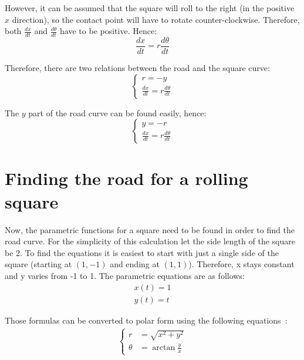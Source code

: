 \documentclass[12pt]{article}
\begin{document}
        However, it can be assumed that the square will roll to the right (in the positive $x$ direction), so the contact point will have to rotate counter-clockwise. Therefore, both $\frac{dx}{dt}$ and $\frac{d\theta}{dt}$ have to be positive. Hence:
        \begin{equation}\label{eq:dxdt}
            \frac{dx}{dt} = r \frac{d\theta}{dt}
        \end{equation}

        Therefore, there are two relations between the road and the square curve:
        \begin{equation}
            \begin{cases}
                r = - y \\
                \frac{dx}{dt} = r \frac{d\theta}{dt}
            \end{cases}
        \end{equation}

        The $y$ part of the road curve can be found easily, hence:
        \begin{equation}\label{eq:road_1}
            \begin{cases}
                y = -r \\
                \frac{dx}{dt} = r \frac{d\theta}{dt}
            \end{cases}
        \end{equation}

    \section{Finding the road for a rolling square}

        Now, the parametric functions for a square need to be found in order to find the road curve. For the simplicity of this calculation let the side length of the square be 2. To find the equations it is easiest to start with just a single side of the square (starting at $(1, -1)$ and ending at $(1, 1)$). Therefore, x stays constant and y varies from -1 to 1. The parametric equations are as follows:
        \begin{align}
            x(t) = 1 \\
            y(t) = t
        \end{align}

        Those formulas can be converted to polar form using the following equations~\cite{polar_rectangular}:
        \begin{align}
            \begin{cases}
                r &= \sqrt{x^2 + y^2} \\
                \theta &= \arctan\frac{y}{x}
            \end{cases}
        \end{align}
\end{document}
